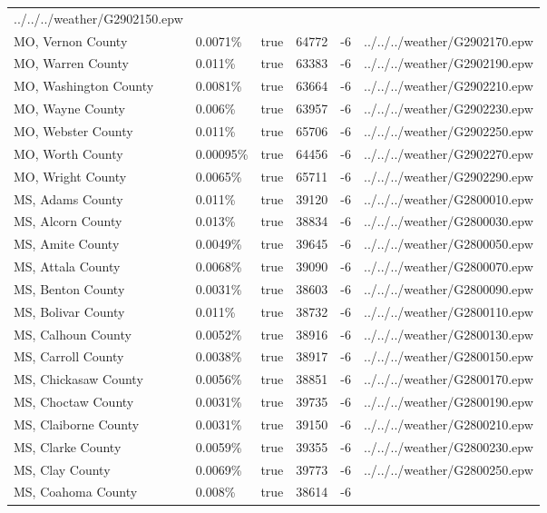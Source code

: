 \begin{longtable}[]{@{}llllll@{}}
../../../weather/G2902150.epw \\
MO, Vernon County & 0.0071\% & true & 64772 & -6 &
../../../weather/G2902170.epw \\
MO, Warren County & 0.011\% & true & 63383 & -6 &
../../../weather/G2902190.epw \\
MO, Washington County & 0.0081\% & true & 63664 & -6 &
../../../weather/G2902210.epw \\
MO, Wayne County & 0.006\% & true & 63957 & -6 &
../../../weather/G2902230.epw \\
MO, Webster County & 0.011\% & true & 65706 & -6 &
../../../weather/G2902250.epw \\
MO, Worth County & 0.00095\% & true & 64456 & -6 &
../../../weather/G2902270.epw \\
MO, Wright County & 0.0065\% & true & 65711 & -6 &
../../../weather/G2902290.epw \\
MS, Adams County & 0.011\% & true & 39120 & -6 &
../../../weather/G2800010.epw \\
MS, Alcorn County & 0.013\% & true & 38834 & -6 &
../../../weather/G2800030.epw \\
MS, Amite County & 0.0049\% & true & 39645 & -6 &
../../../weather/G2800050.epw \\
MS, Attala County & 0.0068\% & true & 39090 & -6 &
../../../weather/G2800070.epw \\
MS, Benton County & 0.0031\% & true & 38603 & -6 &
../../../weather/G2800090.epw \\
MS, Bolivar County & 0.011\% & true & 38732 & -6 &
../../../weather/G2800110.epw \\
MS, Calhoun County & 0.0052\% & true & 38916 & -6 &
../../../weather/G2800130.epw \\
MS, Carroll County & 0.0038\% & true & 38917 & -6 &
../../../weather/G2800150.epw \\
MS, Chickasaw County & 0.0056\% & true & 38851 & -6 &
../../../weather/G2800170.epw \\
MS, Choctaw County & 0.0031\% & true & 39735 & -6 &
../../../weather/G2800190.epw \\
MS, Claiborne County & 0.0031\% & true & 39150 & -6 &
../../../weather/G2800210.epw \\
MS, Clarke County & 0.0059\% & true & 39355 & -6 &
../../../weather/G2800230.epw \\
MS, Clay County & 0.0069\% & true & 39773 & -6 &
../../../weather/G2800250.epw \\
MS, Coahoma County & 0.008\% & true & 38614 & -6 &

\end{longtable}
